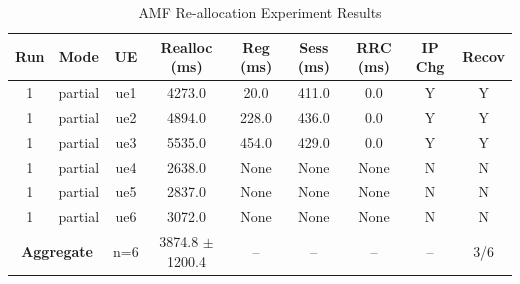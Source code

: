 \begin{table}[ht]
\centering
\begin{tabular}{|c|c|c|c|c|c|c|c|c|}
\hline
Run & Mode & UE & Realloc (ms) & Reg (ms) & Sess (ms) & RRC (ms) & IP Chg & Recov \\
\hline
1 & partial & ue1 & 4273.0 & 20.0 & 411.0 & 0.0 & Y & Y \\
1 & partial & ue2 & 4894.0 & 228.0 & 436.0 & 0.0 & Y & Y \\
1 & partial & ue3 & 5535.0 & 454.0 & 429.0 & 0.0 & Y & Y \\
1 & partial & ue4 & 2638.0 & None & None & None & N & N \\
1 & partial & ue5 & 2837.0 & None & None & None & N & N \\
1 & partial & ue6 & 3072.0 & None & None & None & N & N \\
\multicolumn{2}{|c|}{\textbf{Aggregate}} & n=6 & 3874.8 $\pm$ 1200.4 & -- & -- & -- & -- & 3/6 \\
\hline
\end{tabular}
\caption{AMF Re-allocation Experiment Results}
\label{tab:amf_realloc}
\end{table}
